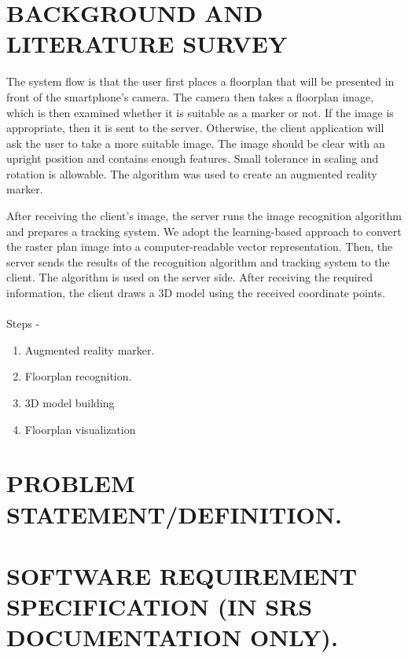 \documentclass[12pt]{article}
\begin{document}
\section{\uppercase{\large{Background and Literature Survey}}}
The system flow is that the user first places a floorplan that will be presented in front of the smartphone’s camera. The camera then takes a floorplan image, which is then examined whether it is suitable as a marker or not. If the image is appropriate, then it is sent to the server. Otherwise, the client application will ask the user to take a more suitable image. The image should be clear with an upright position and contains enough features. Small tolerance in scaling and rotation is allowable. The algorithm was used to create an augmented reality marker.

After receiving the client’s image, the server runs the image recognition algorithm and prepares a tracking system. We adopt the learning-based approach to convert the raster plan image into a computer-readable vector representation. Then, the server sends the results of the recognition algorithm and tracking system to the client. The algorithm is used on the server side. After receiving the required information, the client draws a 3D model using the received coordinate points.\\\\
Steps -
\begin{enumerate}
  \item Augmented reality marker.
  \item Floorplan recognition.
  \item 3D model building
  \item Floorplan visualization
\end{enumerate}

\section{\uppercase{\large{Problem Statement/Definition.}}}

\section{\uppercase{\large{Software Requirement Specification (In SRS Documentation only).}}}
\end{document}
